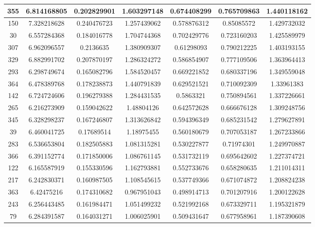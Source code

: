 \documentclass[UTF8]{ctexart}
\begin{document}
\begin{center}
\begin{longtable}{|c|c|c|c|c|c|c|}
		355    & 6.814168805 & 0.202829901 & 1.603297148 & 0.674408299 & 0.765709863     & 1.440118162 \\ \hline
		150    & 7.328218628 & 0.240476723 & 1.257439062 & 0.578876312 & 0.85085572      & 1.429732032 \\ \hline
		30     & 6.557284368 & 0.184016778 & 1.704744368 & 0.702429776 & 0.723160203     & 1.425589979 \\ \hline
		307    & 6.962096557 & 0.2136635   & 1.380909307 & 0.61298093  & 0.790212225     & 1.403193155 \\ \hline
		329    & 6.882991702 & 0.207870197 & 1.286324272 & 0.586854907 & 0.777109506     & 1.363964413 \\ \hline
		293    & 6.298749674 & 0.165082796 & 1.584520457 & 0.669221852 & 0.680337196     & 1.349559048 \\ \hline
		364    & 6.478389768 & 0.178238873 & 1.440791839 & 0.629521521 & 0.710092309     & 1.33961383  \\ \hline
		142    & 6.724724606 & 0.196279388 & 1.284431535 & 0.5863321   & 0.750894561     & 1.337226661 \\ \hline
		265    & 6.216273909 & 0.159042622 & 1.48804126  & 0.642572628 & 0.666676128     & 1.309248756 \\ \hline
		345    & 6.328298237 & 0.167246807 & 1.313626842 & 0.594396349 & 0.685231542     & 1.279627891 \\ \hline
		39     & 6.460041725 & 0.17689514  & 1.18975455  & 0.560180679 & 0.707053187     & 1.267233866 \\ \hline
		283    & 6.536653804 & 0.182505883 & 1.081315281 & 0.530227877 & 0.71974301      & 1.249970887 \\ \hline
		366    & 6.391152774 & 0.171850006 & 1.086761145 & 0.531732119 & 0.695642602     & 1.227374721 \\ \hline
		122    & 6.165587919 & 0.155330596 & 1.162793881 & 0.552733676 & 0.658280635     & 1.211014311 \\ \hline
		217    & 6.242830371 & 0.160987505 & 1.108545615 & 0.537749366 & 0.671074872     & 1.208824238 \\ \hline
		363    & 6.42475216  & 0.174310682 & 0.967951043 & 0.498914713 & 0.701207916     & 1.200122628 \\ \hline
		243    & 6.256443485 & 0.161984471 & 1.051499232 & 0.521992168 & 0.673329711     & 1.195321879 \\ \hline
		79     & 6.284391587 & 0.164031271 & 1.006025901 & 0.509431647 & 0.677958961     & 1.187390608 \\ \hline

\end{longtable}
\end{center}
\end{document}
